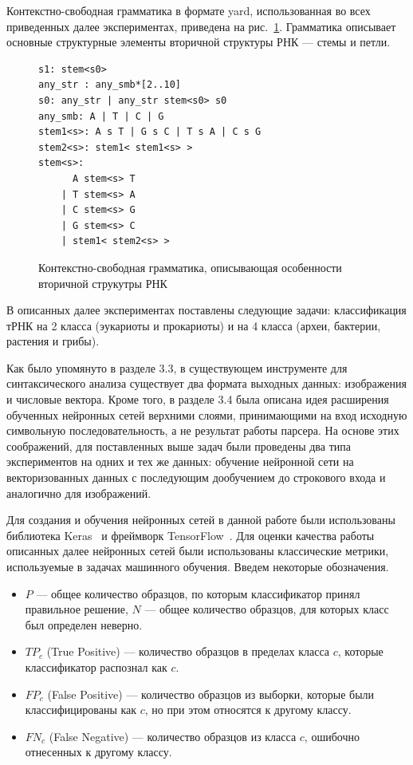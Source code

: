 Контекстно-свободная грамматика в формате yard, использованная во всех приведенных далее экспериментах, приведена на рис.~\ref{rna}. Грамматика описывает основные структурные элементы вторичной структуры РНК --- стемы и петли.

\begin{figure} [h]
\begin{verbatim}
s1: stem<s0>
any_str : any_smb*[2..10]
s0: any_str | any_str stem<s0> s0
any_smb: A | T | C | G
stem1<s>: A s T | G s C | T s A | C s G
stem2<s>: stem1< stem1<s> >
stem<s>:
      A stem<s> T
    | T stem<s> A
    | C stem<s> G
    | G stem<s> C
    | stem1< stem2<s> >
\end{verbatim}
\caption{Контекстно-свободная грамматика, описывающая особенности вторичной струкутры РНК}
\label{rna}
\end{figure}

В описанных далее экспериментах поставлены следующие задачи: классификация тРНК на 2 класса (эукариоты и прокариоты) и на 4 класса (археи, бактерии, растения и грибы).

Как было упомянуто в разделе 3.3, в существующем инструменте для синтаксического анализа существует два формата выходных данных: изображения и числовые вектора. Кроме того, в разделе 3.4 была описана идея расширения обученных нейронных сетей верхними слоями, принимающими на вход исходную символьную последовательность, а не результат работы парсера. На основе этих соображений, для поставленных выше задач были проведены два типа экспериментов на одних и тех же данных: обучение нейронной сети на векторизованных данных с последующим дообучением до строкового входа и аналогично для изображений.


Для создания и обучения нейронных сетей в данной работе были использованы библиотека Keras~\cite{keras} и фреймворк TensorFlow~\cite{tensorflow}.
Для оценки качества работы описанных далее нейронных сетей были использованы классические метрики, используемые в задачах машинного обучения. Введем некоторые обозначения.
\begin{itemize}
    \item $P$ --- общее количество образцов, по которым классификатор принял правильное решение, $N$ --- общее количество образцов, для которых класс был определен неверно.
    \item $TP_{c}$ (True Positive) --- количество образцов в пределах класса $c$, которые классификатор распознал как $c$.
    \item $FP_{c}$ (False Positive) --- количество образцов из выборки, которые были классифицированы как $c$, но при этом относятся к другому классу.
    \item $FN_{c}$ (False Negative) --- количество образцов из класса $c$, ошибочно отнесенных к другому классу.
\end{itemize}

